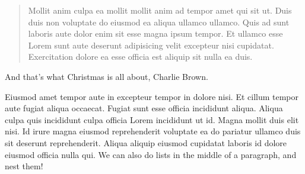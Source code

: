 \documentclass[
    12pt,
    letterpaper,
    oneside,
    noraggedright
]{turabian-researchpaper}
\begin{document}
\begin{quote}
Mollit anim culpa ea mollit mollit anim ad tempor amet qui sit ut. Duis
duis non voluptate do eiusmod ea aliqua ullamco ullamco. Quis ad sunt
laboris aute dolor enim sit esse magna ipsum tempor. Et ullamco esse
Lorem sunt aute deserunt adipisicing velit excepteur nisi cupidatat.
Exercitation dolore ea esse officia est aliquip sit nulla ea duis.
\end{quote}

\noindent{}And that's what Christmas is all about, Charlie Brown.

Eiusmod amet tempor aute in excepteur tempor in dolore nisi. Et cillum
tempor aute fugiat aliqua occaecat. Fugiat sunt esse officia incididunt
aliqua. Aliqua culpa quis incididunt culpa officia Lorem incididunt ut
id. Magna mollit duis elit nisi. Id irure magna eiusmod reprehenderit
voluptate ea do pariatur ullamco duis sit deserunt reprehenderit. Aliqua
aliquip eiusmod cupidatat laboris id dolore eiusmod officia nulla qui.
We can also do lists in the middle of a paragraph, and nest them!
\end{document}
